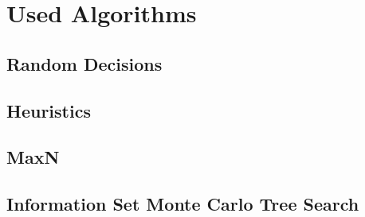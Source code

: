 \chapter{Used Algorithms}

\section{Random Decisions}

\section{Heuristics}

\section{MaxN}
\label{sec:algomaxn}

\section{Information Set Monte Carlo Tree Search}

